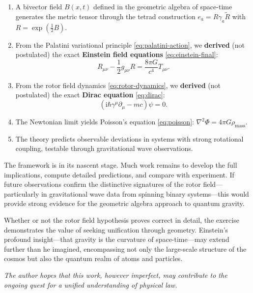 \documentclass[11pt,a4paper]{article}
\numberwithin{equation}{section}
\theoremstyle{plain}
\theoremstyle{definition}
\theoremstyle{remark}
\newcommand{\ii}{\mathrm{i}}
\newif\ifack
\begin{document}
\begin{enumerate}
  \item A bivector field $B(x,t)$ defined in the geometric algebra of space-time generates the metric tensor through the tetrad construction $e_a = R\gamma_a\widetilde{R}$ with $R = \exp(\frac{1}{2}B)$.
  \item From the Palatini variational principle \eqref{eq:palatini-action}, we \textbf{derived} (not postulated) the exact \textbf{Einstein field equations} \eqref{eq:einstein-final}:
  \begin{equation*}
  R_{\mu\nu} - \frac{1}{2}g_{\mu\nu}R = \frac{8\pi G}{c^4} T_{\mu\nu}.
  \end{equation*}
  \item From the rotor field dynamics \eqref{eq:rotor-dynamics}, we \textbf{derived} (not postulated) the exact \textbf{Dirac equation} \eqref{eq:dirac}:
  \begin{equation*}
  (\ii\hbar\gamma^\mu \partial_\mu - mc)\psi = 0.
  \end{equation*}
  \item The Newtonian limit yields Poisson's equation \eqref{eq:poisson}: $\nabla^2\Phi = 4\pi G\rho_{\mathrm{mass}}$.
  \item The theory predicts observable deviations in systems with strong rotational coupling, testable through gravitational wave observations.
\end{enumerate}

The framework is in its nascent stage. Much work remains to develop the full implications, compute detailed predictions, and compare with experiment. If future observations confirm the distinctive signatures of the rotor field---particularly in gravitational wave data from spinning binary systems---this would provide strong evidence for the geometric algebra approach to quantum gravity.

Whether or not the rotor field hypothesis proves correct in detail, the exercise demonstrates the value of seeking unification through geometry. Einstein's profound insight---that gravity is the curvature of space-time---may extend further than he imagined, encompassing not only the large-scale structure of the cosmos but also the quantum realm of atoms and particles.

\medskip
\noindent\textit{The author hopes that this work, however imperfect, may contribute to the ongoing quest for a unified understanding of physical law.}

\ifack
\end{document}
